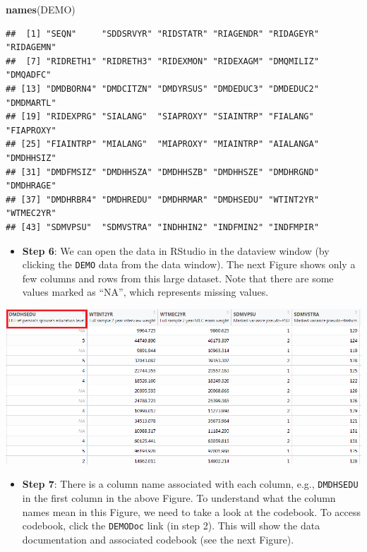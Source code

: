 \documentclass[
]{book}
\newenvironment{Shaded}{\begin{snugshade}}{\end{snugshade}}
\newcommand{\KeywordTok}[1]{\textcolor[rgb]{0.13,0.29,0.53}{\textbf{#1}}}
\newcommand{\NormalTok}[1]{#1}
\providecommand{\tightlist}{%
  \setlength{\itemsep}{0pt}\setlength{\parskip}{0pt}}
\begin{document}
\begin{Shaded}
\begin{Highlighting}[]
\KeywordTok{names}\NormalTok{(DEMO)}
\end{Highlighting}
\end{Shaded}

\begin{verbatim}
##  [1] "SEQN"     "SDDSRVYR" "RIDSTATR" "RIAGENDR" "RIDAGEYR" "RIDAGEMN"
##  [7] "RIDRETH1" "RIDRETH3" "RIDEXMON" "RIDEXAGM" "DMQMILIZ" "DMQADFC" 
## [13] "DMDBORN4" "DMDCITZN" "DMDYRSUS" "DMDEDUC3" "DMDEDUC2" "DMDMARTL"
## [19] "RIDEXPRG" "SIALANG"  "SIAPROXY" "SIAINTRP" "FIALANG"  "FIAPROXY"
## [25] "FIAINTRP" "MIALANG"  "MIAPROXY" "MIAINTRP" "AIALANGA" "DMDHHSIZ"
## [31] "DMDFMSIZ" "DMDHHSZA" "DMDHHSZB" "DMDHHSZE" "DMDHRGND" "DMDHRAGE"
## [37] "DMDHRBR4" "DMDHREDU" "DMDHRMAR" "DMDHSEDU" "WTINT2YR" "WTMEC2YR"
## [43] "SDMVPSU"  "SDMVSTRA" "INDHHIN2" "INDFMIN2" "INDFMPIR"
\end{verbatim}

\begin{itemize}
\tightlist
\item
  \textbf{Step 6}: We can open the data in RStudio in the dataview window (by clicking the \texttt{DEMO} data from the data window). The next Figure shows only a few columns and rows from this large dataset. Note that there are some values marked as ``NA'', which represents missing values.
\end{itemize}

\includegraphics[width=0.65\linewidth]{images/dataview}

\begin{itemize}
\tightlist
\item
  \textbf{Step 7}: There is a column name associated with each column, e.g., \texttt{DMDHSEDU} in the first column in the above Figure. To understand what the column names mean in this Figure, we need to take a look at the codebook. To access codebook, click the \texttt{\textquotesingle{}DEMO\textbar{}Doc\textquotesingle{}} link (in step 2). This will show the data documentation and associated codebook (see the next Figure).
\end{itemize}
\end{document}
